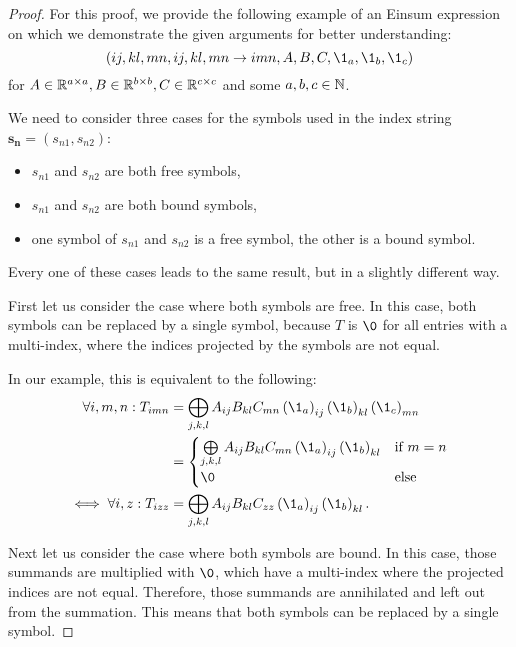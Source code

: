 \begin{proof}
    \small
    For this proof, we provide the following example of an Einsum expression on which we demonstrate the given arguments for better understanding:
    $$(ij, kl, mn, ij, kl, mn \rightarrow imn, A, B, C, \1_a, \1_b, \1_c)$$
    for $A \in \mathbb{R}^{a \times a}, B \in \mathbb{R}^{b \times b}, C \in \mathbb{R}^{c \times c}$ and some $a,b,c \in \mathbb{N}$.

    We need to consider three cases for the symbols used in the index string $\bm{s_n} = (s_{n1}, s_{n2})$:
    \begin{itemize}
        \item $s_{n1}$ and $s_{n2}$ are both free symbols,
        \item $s_{n1}$ and $s_{n2}$ are both bound symbols,
        \item one symbol of $s_{n1}$ and $s_{n2}$ is a free symbol, the other is a bound symbol.
    \end{itemize}
    Every one of these cases leads to the same result, but in a slightly different way.

    First let us consider the case where both symbols are free.
    In this case, both symbols can be replaced by a single symbol,
    because $T$ is $\0$ for all entries with a multi-index,
    where the indices projected by the symbols are not equal.

    In our example, this is equivalent to the following:
    \begin{align*}
        \forall i,m,n: T_{imn}    & = \bigoplus\limits_{j,k,l} A_{ij} B_{kl} C_{mn} \left(\1_a\right)_{ij} \left(\1_b\right)_{kl} \left(\1_c\right)_{mn} \\
                                  & = \begin{cases}
            \bigoplus\limits_{j,k,l} A_{ij} B_{kl} C_{mn} \left(\1_a\right)_{ij} \left(\1_b\right)_{kl} & \text{if $m = n$} \\
            \0                                                                                          & \text{else}
        \end{cases}                                                                                          \\
        \iff \forall i,z: T_{izz} & = \bigoplus\limits_{j,k,l} A_{ij} B_{kl} C_{zz} \left(\1_a\right)_{ij} \left(\1_b\right)_{kl}.
    \end{align*}

    Next let us consider the case where both symbols are bound.
    In this case, those summands are multiplied with $\0$,
    which have a multi-index where the projected indices are not equal.
    Therefore, those summands are annihilated and left out from the summation.
    This means that both symbols can be replaced by a single symbol.


\end{proof}
